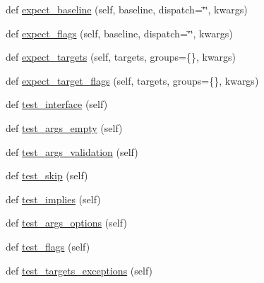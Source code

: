 \begin{DoxyCompactItemize}
def \hyperlink{classnumpy_1_1distutils_1_1tests_1_1test__ccompiler__opt_1_1__Test__CCompilerOpt_a45cf30adda404da898e7408aa0526a31}{expect\+\_\+baseline} (self, baseline, dispatch=\char`\"{}\char`\"{}, kwargs)
\item 
def \hyperlink{classnumpy_1_1distutils_1_1tests_1_1test__ccompiler__opt_1_1__Test__CCompilerOpt_a63995dfc02224966f60d3b6070c49b9f}{expect\+\_\+flags} (self, baseline, dispatch=\char`\"{}\char`\"{}, kwargs)
\item 
def \hyperlink{classnumpy_1_1distutils_1_1tests_1_1test__ccompiler__opt_1_1__Test__CCompilerOpt_a9d881996fce66017873df49ffd8552a0}{expect\+\_\+targets} (self, targets, groups=\{\}, kwargs)
\item 
def \hyperlink{classnumpy_1_1distutils_1_1tests_1_1test__ccompiler__opt_1_1__Test__CCompilerOpt_a08c0d65688dae99338d90c718a02a2c0}{expect\+\_\+target\+\_\+flags} (self, targets, groups=\{\}, kwargs)
\item 
def \hyperlink{classnumpy_1_1distutils_1_1tests_1_1test__ccompiler__opt_1_1__Test__CCompilerOpt_a5bbf5736843b3c288d23f15c323eab45}{test\+\_\+interface} (self)
\item 
def \hyperlink{classnumpy_1_1distutils_1_1tests_1_1test__ccompiler__opt_1_1__Test__CCompilerOpt_af9980ae49dfe98275dbe933a5c43a41b}{test\+\_\+args\+\_\+empty} (self)
\item 
def \hyperlink{classnumpy_1_1distutils_1_1tests_1_1test__ccompiler__opt_1_1__Test__CCompilerOpt_a3c66a816339afb74e27a95b108644294}{test\+\_\+args\+\_\+validation} (self)
\item 
def \hyperlink{classnumpy_1_1distutils_1_1tests_1_1test__ccompiler__opt_1_1__Test__CCompilerOpt_a9e0f0b0995c78b427a64e27f9993e452}{test\+\_\+skip} (self)
\item 
def \hyperlink{classnumpy_1_1distutils_1_1tests_1_1test__ccompiler__opt_1_1__Test__CCompilerOpt_aae0793933a2bc34cbcf3ab16da3b48f3}{test\+\_\+implies} (self)
\item 
def \hyperlink{classnumpy_1_1distutils_1_1tests_1_1test__ccompiler__opt_1_1__Test__CCompilerOpt_afb156069ea1ecaccf71a93731a2109c8}{test\+\_\+args\+\_\+options} (self)
\item 
def \hyperlink{classnumpy_1_1distutils_1_1tests_1_1test__ccompiler__opt_1_1__Test__CCompilerOpt_a66f1b3fc76a5d73874a0c68f2f80bbe2}{test\+\_\+flags} (self)
\item 
def \hyperlink{classnumpy_1_1distutils_1_1tests_1_1test__ccompiler__opt_1_1__Test__CCompilerOpt_a4da5307c6705282c03b5f7d66b99d11f}{test\+\_\+targets\+\_\+exceptions} (self)

\end{DoxyCompactItemize}
